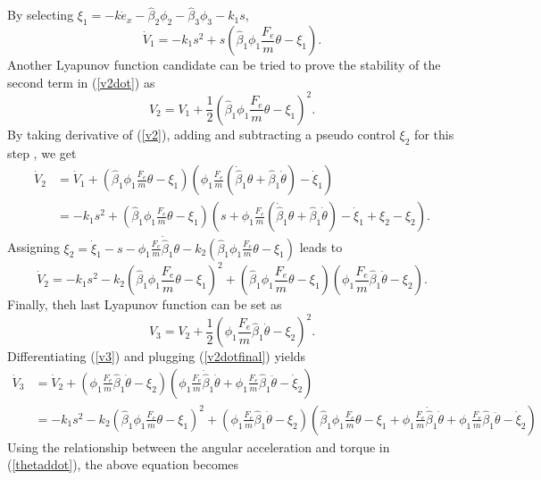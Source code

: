 By selecting $\xi_1=-k\dot{e}_x-\hat{\beta}_2\phi_2-\hat{\beta}_3\phi_3-k_1s$, 
\begin{equation}
\dot{V}_1=-k_1s^2+ s(\hat{\beta}_1\phi_1\frac{F_e}{m}\theta-\xi_1).
\label{v2dot}
\end{equation}
Another Lyapunov function candidate can be tried to prove the stability of the second term in (\ref{v2dot}) as
\begin{equation}
V_2=V_1+\frac{1}{2}(\hat{\beta}_1\phi_1\frac{F_e}{m}\theta-\xi_1)^2.
\label{v2}
\end{equation}
By taking derivative of (\ref{v2}), adding and subtracting a pseudo control $\xi_2$ for this step , we get
\begin{align}
\dot{V}_2&=\dot{V}_1+(\hat{\beta}_1\phi_1\frac{F_e}{m}\theta-\xi_1)(\phi_1\frac{F_e}{m}(\dot{\hat{\beta}}_1\theta+\hat{\beta}_1\dot{\theta})-\dot{\xi}_1)
\\&=-k_1s^2+
(\hat{\beta}_1\phi_1\frac{F_e}{m}\theta-\xi_1)
(s+\phi_1\frac{F_e}{m}(\dot{\hat{\beta}}_1\theta+\hat{\beta}_1\dot{\theta})-\dot{\xi}_1+\xi_2-\xi_2).
\end{align}
Assigning $\xi_2=\dot{\xi}_1-s-\phi_1\frac{F_e}{m}\dot{\hat{\beta}}_1\theta-k_2(\hat{\beta}_1\phi_1\frac{F_e}{m}\theta-\xi_1)$ leads to
\begin{equation}
\dot{V}_2=-k_1s^2-k_2(\hat{\beta}_1\phi_1\frac{F_e}{m}\theta-\xi_1)^2+
(\hat{\beta}_1\phi_1\frac{F_e}{m}\theta-\xi_1)
(\phi_1\frac{F_e}{m}\hat{\beta}_1\dot{\theta}-\xi_2).
\label{v2dotfinal}
\end{equation}
Finally, theh last Lyapunov function can be set as 
\begin{equation}
V_3=V_2+\frac{1}{2}(\phi_1\frac{F_e}{m}\hat{\beta}_1\dot{\theta}-\xi_2)^2.
\label{v3}
\end{equation}
Differentiating (\ref{v3}) and plugging (\ref{v2dotfinal}) yields
\begin{align}
\dot{V}_3&=\dot{V}_2+
(\phi_1\frac{F_e}{m}\hat{\beta}_1\dot{\theta}-\xi_2)
(\phi_1\frac{F_e}{m}\dot{\hat{\beta}}_1\dot{\theta}+\phi_1\frac{F_e}{m}\hat{\beta}_1\ddot{\theta}-\dot{\xi}_2)
\\&=-k_1s^2-k_2(\hat{\beta}_1\phi_1\frac{F_e}{m}\theta-\xi_1)^2+(\phi_1\frac{F_e}{m}\hat{\beta}_1\dot{\theta}-\xi_2)
(\hat{\beta}_1\phi_1\frac{F_e}{m}\theta-\xi_1+\phi_1\frac{F_e}{m}\dot{\hat{\beta}}_1\dot{\theta}+\phi_1\frac{F_e}{m}\hat{\beta}_1\ddot{\theta}-\dot{\xi}_2)
\label{v3dot}
\end{align}
 Using the relationship between the angular acceleration and torque in (\ref{thetaddot}), the above equation becomes
